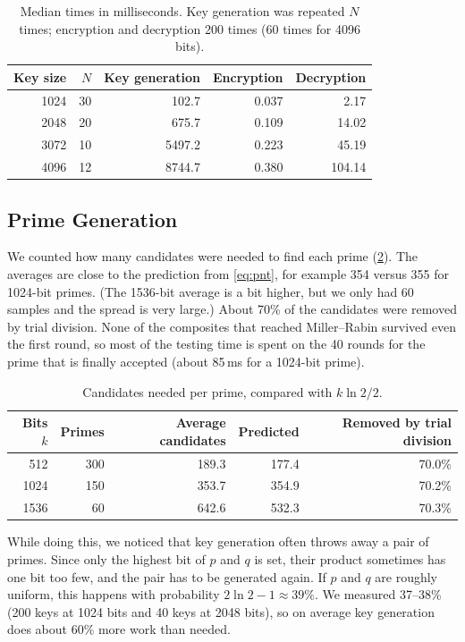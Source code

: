 \documentclass[runningheads]{llncs}
\begin{document}
\begin{table}[t]
\centering
\caption{Median times in milliseconds. Key generation was repeated $N$
times; encryption and decryption 200 times (60 times for 4096
bits).}\label{tab:bench}
\scriptsize
\begin{tabular}{@{}rrrrr@{}}
\toprule
Key size & $N$ & Key generation & Encryption & Decryption \\
\midrule
1024 & 30 &  102.7 & 0.037 &   2.17 \\
2048 & 20 &  675.7 & 0.109 &  14.02 \\
3072 & 10 & 5497.2 & 0.223 &  45.19 \\
4096 & 12 & 8744.7 & 0.380 & 104.14 \\
\bottomrule
\end{tabular}
\end{table}

\subsection{Prime Generation}

We counted how many candidates were needed to find each prime
(\cref{tab:primes}). The averages are close to the prediction from
\cref{eq:pnt}, for example 354 versus 355 for 1024-bit primes. (The 1536-bit
average is a bit higher, but we only had 60 samples and the spread is very
large.) About 70\% of the candidates were removed by trial division. None of
the composites that reached Miller--Rabin survived even the first round, so
most of the testing time is spent on the 40 rounds for the prime that is
finally accepted (about 85\,ms for a 1024-bit prime).

\begin{table}[t]
\centering
\caption{Candidates needed per prime, compared with $k \ln 2 / 2$.}\label{tab:primes}
\scriptsize
\begin{tabular}{@{}rrrrr@{}}
\toprule
Bits $k$ & Primes & Average candidates & Predicted & Removed by trial division \\
\midrule
512  & 300 & 189.3 & 177.4 & 70.0\% \\
1024 & 150 & 353.7 & 354.9 & 70.2\% \\
1536 &  60 & 642.6 & 532.3 & 70.3\% \\
\bottomrule
\end{tabular}
\end{table}

While doing this, we noticed that key generation often throws away a pair of
primes. Since only the highest bit of $p$ and $q$ is set, their product
sometimes has one bit too few, and the pair has to be generated again. If
$p$ and $q$ are roughly uniform, this happens with probability $2\ln 2 - 1
\approx 39\%$. We measured 37--38\% (200 keys at 1024 bits and 40 keys at
2048 bits), so on average key generation does about 60\% more work than
needed.
\end{document}
